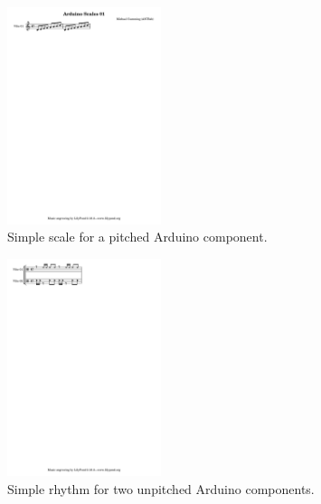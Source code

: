 \documentclass[a4paper, twocolumn]{article}
\begin{document}
\begin{figure}[htb]
    \begin{center}
        \includegraphics[width=0.4\textwidth]{graphics/scaleArduino-01.pdf}
    \end{center}
    \caption{Simple scale for a pitched Arduino component.\label{fig:fig2}}
\end{figure}

\begin{figure}[htb]
    \begin{center}
        \includegraphics[width=0.4\textwidth]{graphics/drums1-simple.pdf}
    \end{center}
    \caption{Simple rhythm for two unpitched Arduino components.\label{fig:fig3}}
\end{figure}
\end{document}
